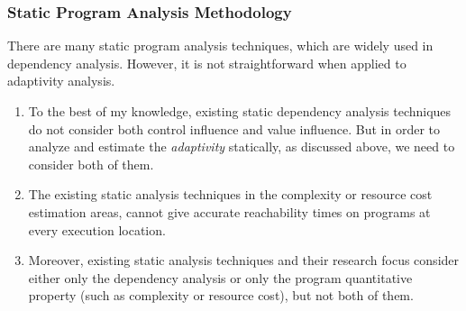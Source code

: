 \subsubsection{Static Program Analysis Methodology}
\label{sec:intro-static}
There are many static program analysis techniques, which are widely used in dependency analysis. 
However, it is not straightforward when applied to adaptivity analysis.
\begin{enumerate}
\item To the best of my knowledge,
existing static dependency analysis techniques do not consider both control influence and value influence.
But in order to analyze and estimate the \emph{adaptivity} statically, as discussed above, we need to consider both of them.
\item The existing static analysis techniques in the complexity or resource cost estimation areas,
cannot give accurate reachability times on programs 
at every execution location.
\item Moreover, existing static analysis techniques and their research focus consider
either only the dependency analysis
or only the program quantitative property (such as complexity or resource cost),
but not both of them.
\end{enumerate}

